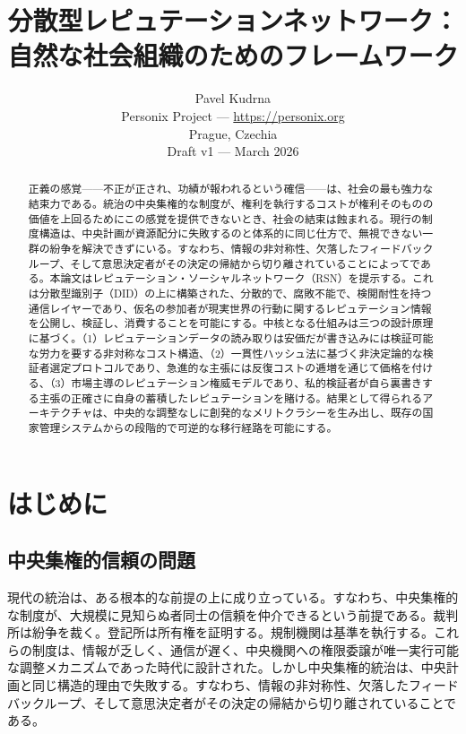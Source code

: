 \documentclass[11pt,a4paper,twocolumn]{article}
\title{\textbf{分散型レピュテーションネットワーク：\\自然な社会組織のためのフレームワーク}}
\author{Pavel Kudrna\\Personix Project --- \url{https://personix.org}\\Prague, Czechia\\Draft v1 --- March 2026}
\date{}
\begin{document}
\maketitle

\begin{abstract}
正義の感覚——不正が正され、功績が報われるという確信——は、社会の最も強力な結束力である。統治の中央集権的な制度が、権利を執行するコストが権利そのものの価値を上回るためにこの感覚を提供できないとき、社会の結束は蝕まれる。現行の制度構造は、中央計画が資源配分に失敗するのと体系的に同じ仕方で、無視できない一群の紛争を解決できずにいる。すなわち、情報の非対称性、欠落したフィードバックループ、そして意思決定者がその決定の帰結から切り離されていることによってである。本論文はレピュテーション・ソーシャルネットワーク（RSN）を提示する。これは分散型識別子（DID）の上に構築された、分散的で、腐敗不能で、検閲耐性を持つ通信レイヤーであり、仮名の参加者が現実世界の行動に関するレピュテーション情報を公開し、検証し、消費することを可能にする。中核となる仕組みは三つの設計原理に基づく。（1）レピュテーションデータの読み取りは安価だが書き込みには検証可能な労力を要する非対称なコスト構造、（2）一貫性ハッシュ法に基づく非決定論的な検証者選定プロトコルであり、急進的な主張には反復コストの逓増を通じて価格を付ける、（3）市場主導のレピュテーション権威モデルであり、私的検証者が自ら裏書きする主張の正確さに自身の蓄積したレピュテーションを賭ける。結果として得られるアーキテクチャは、中央的な調整なしに創発的なメリトクラシーを生み出し、既存の国家管理システムからの段階的で可逆的な移行経路を可能にする。
\end{abstract}

\section{はじめに}

\subsection{中央集権的信頼の問題}

現代の統治は、ある根本的な前提の上に成り立っている。すなわち、中央集権的な制度が、大規模に見知らぬ者同士の信頼を仲介できるという前提である。裁判所は紛争を裁く。登記所は所有権を証明する。規制機関は基準を執行する。これらの制度は、情報が乏しく、通信が遅く、中央機関への権限委譲が唯一実行可能な調整メカニズムであった時代に設計された。しかし中央集権的統治は、中央計画と同じ構造的理由で失敗する。すなわち、情報の非対称性、欠落したフィードバックループ、そして意思決定者がその決定の帰結から切り離されていることである。
\end{document}
